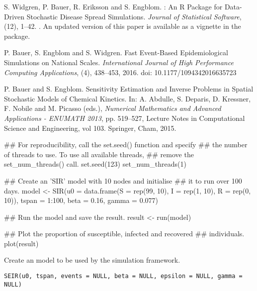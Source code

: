 \documentclass[letterpaper]{book}
\begin{document}
%
\begin{References}
S. Widgren, P. Bauer, R. Eriksson and S. Engblom. : An \textsf{R} Package for Data-Driven Stochastic Disease Spread Simulations. \emph{Journal of Statistical Software}, (12), 1--42. . An updated version of this paper is available as a vignette in the package.

P. Bauer, S. Engblom and S. Widgren. Fast Event-Based Epidemiological Simulations on National Scales. \emph{International Journal of High Performance Computing Applications}, (4), 438--453, 2016. doi: 10.1177/1094342016635723

P. Bauer and S. Engblom. Sensitivity Estimation and Inverse Problems in Spatial Stochastic Models of Chemical Kinetics. In: A. Abdulle, S. Deparis, D. Kressner, F. Nobile and M. Picasso (eds.), \emph{Numerical Mathematics and Advanced Applications - ENUMATH 2013}, pp. 519--527, Lecture Notes in Computational Science and Engineering, vol 103. Springer, Cham, 2015. 
\end{References}
%
\begin{Examples}
\begin{ExampleCode}
## For reproducibility, call the set.seed() function and specify
## the number of threads to use. To use all available threads,
## remove the set_num_threads() call.
set.seed(123)
set_num_threads(1)

## Create an 'SIR' model with 10 nodes and initialise
## it to run over 100 days.
model <- SIR(u0 = data.frame(S = rep(99, 10),
                             I = rep(1, 10),
                             R = rep(0, 10)),
             tspan = 1:100,
             beta = 0.16,
             gamma = 0.077)

## Run the model and save the result.
result <- run(model)

## Plot the proportion of susceptible, infected and recovered
## individuals.
plot(result)
\end{ExampleCode}
\end{Examples}
%
\begin{Description}
Create an  model to be used by the simulation
framework.
\end{Description}
%
\begin{Usage}
\begin{verbatim}
SEIR(u0, tspan, events = NULL, beta = NULL, epsilon = NULL, gamma = NULL)
\end{verbatim}
\end{Usage}
\end{document}
